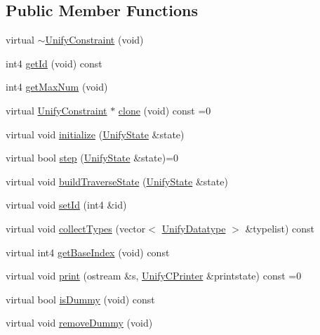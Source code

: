 \subsection*{Public Member Functions}
\begin{DoxyCompactItemize}
\item 
virtual \mbox{\hyperlink{class_unify_constraint_a733f8ac84d286fed6cc06a0484db7296}{$\sim$\+Unify\+Constraint}} (void)
\item 
int4 \mbox{\hyperlink{class_unify_constraint_a049013abc1805120f71abef80bc6435a}{get\+Id}} (void) const
\item 
int4 \mbox{\hyperlink{class_unify_constraint_a93c5666cbe0707cfb6aa40d284dca457}{get\+Max\+Num}} (void)
\item 
virtual \mbox{\hyperlink{class_unify_constraint}{Unify\+Constraint}} $\ast$ \mbox{\hyperlink{class_unify_constraint_a4f068343932637d355644bb21559aa12}{clone}} (void) const =0
\item 
virtual void \mbox{\hyperlink{class_unify_constraint_ac812e2cf68c95e8a5c0e7e8ac02f2fc2}{initialize}} (\mbox{\hyperlink{class_unify_state}{Unify\+State}} \&state)
\item 
virtual bool \mbox{\hyperlink{class_unify_constraint_ad9ab4ad91037f96bf803735d414d212d}{step}} (\mbox{\hyperlink{class_unify_state}{Unify\+State}} \&state)=0
\item 
virtual void \mbox{\hyperlink{class_unify_constraint_a5e1db6cd9dc1c2c22f6a98d5c1556e41}{build\+Traverse\+State}} (\mbox{\hyperlink{class_unify_state}{Unify\+State}} \&state)
\item 
virtual void \mbox{\hyperlink{class_unify_constraint_ae839484226265859ee04807fd7bb7775}{set\+Id}} (int4 \&id)
\item 
virtual void \mbox{\hyperlink{class_unify_constraint_acb83b6bea3b21e13054e72ac9cfaba0f}{collect\+Types}} (vector$<$ \mbox{\hyperlink{class_unify_datatype}{Unify\+Datatype}} $>$ \&typelist) const
\item 
virtual int4 \mbox{\hyperlink{class_unify_constraint_a44f0164f38ac1fdc44fc73ebe7678de1}{get\+Base\+Index}} (void) const
\item 
virtual void \mbox{\hyperlink{class_unify_constraint_a774f6a611a96384766cb8e8d8f5ff41f}{print}} (ostream \&s, \mbox{\hyperlink{class_unify_c_printer}{Unify\+C\+Printer}} \&printstate) const =0
\item 
virtual bool \mbox{\hyperlink{class_unify_constraint_a260263ddd2fea5ac847302d12feeb031}{is\+Dummy}} (void) const
\item 
virtual void \mbox{\hyperlink{class_unify_constraint_ab2ca6cad0ed83f5c765bd0ee8682ca36}{remove\+Dummy}} (void)
\end{DoxyCompactItemize}
